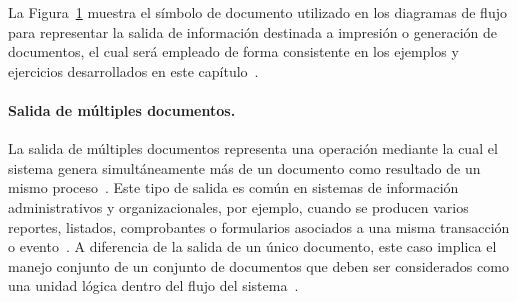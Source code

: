 \documentclass[12pt,twoside]{book}
\begin{document}
						La Figura~\ref{fig:DFSimpleDocumento} muestra el símbolo de documento utilizado en los diagramas de flujo para representar la salida de información destinada a impresión o generación de documentos, el cual será empleado de forma consistente en los ejemplos y ejercicios desarrollados en este capítulo~\cite{Joyanes2007Fundamentos,Kendall2014Systems}.
						\begin{figure}[h]
							\centering
							\label{fig:DFSimpleDocumento}
						\end{figure}
						
						\paragraph{Salida de múltiples documentos.}
						La salida de múltiples documentos representa una operación mediante la cual el sistema genera simultáneamente más de un documento como resultado de un mismo proceso~\cite{Joyanes2007Fundamentos,Kendall2014Systems}. Este tipo de salida es común en sistemas de información administrativos y organizacionales, por ejemplo, cuando se producen varios reportes, listados, comprobantes o formularios asociados a una misma transacción o evento~\cite{Kendall2014Systems,Pressman2019Software}. A diferencia de la salida de un único documento, este caso implica el manejo conjunto de un conjunto de documentos que deben ser considerados como una unidad lógica dentro del flujo del sistema~\cite{Manzano2017Programacion}.
						
\end{document}
